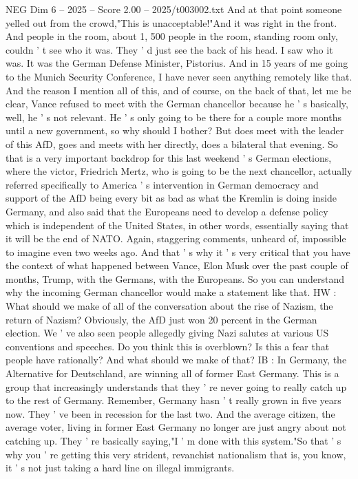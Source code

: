 \begin{textsample}{NEG Dim 6 – 2025 – Score 2.00 – 2025/t003002.txt}
And at that point someone yelled out from the crowd,"This is unacceptable!"And it was right in the front.
And people in the room, about 1, 500 people in the room, standing room only, couldn ' t see who it was.
They ' d just see the back of his head.
I saw who it was.
It was the German Defense Minister, Pistorius.
And in 15 years of me going to the Munich Security Conference, I have never seen anything remotely like that.
And the reason I mention all of this, and of course, on the back of that, let me be clear, Vance refused to meet with the German chancellor because he ' s basically, well, he ' s not relevant.
He ' s only going to be there for a couple more months until a new government, so why should I bother?
But does meet with the leader of this AfD, goes and meets with her directly, does a bilateral that evening.
So that is a very important backdrop for this last weekend ' s German elections, where the victor, Friedrich Mertz, who is going to be the next chancellor, actually referred specifically to America ' s intervention in German democracy and support of the AfD being every bit as bad as what the Kremlin is doing inside Germany, and also said that the Europeans need to develop a defense policy which is independent of the United States, in other words, essentially saying that it will be the end of NATO.
Again, staggering comments, unheard of, impossible to imagine even two weeks ago.
And that ' s why it ' s very critical that you have the context of what happened between Vance, Elon Musk over the past couple of months, Trump, with the Germans, with the Europeans.
So you can understand why the incoming German chancellor would make a statement like that.
HW : What should we make of all of the conversation about the rise of Nazism, the return of Nazism?
Obviously, the AfD just won 20 percent in the German election.
We ' ve also seen people allegedly giving Nazi salutes at various US conventions and speeches.
Do you think this is overblown?
Is this a fear that people have rationally?
And what should we make of that?
IB : In Germany, the Alternative for Deutschland, are winning all of former East Germany.
This is a group that increasingly understands that they ' re never going to really catch up to the rest of Germany.
Remember, Germany hasn ' t really grown in five years now.
They ' ve been in recession for the last two.
And the average citizen, the average voter, living in former East Germany no longer are just angry about not catching up.
They ' re basically saying,"I ' m done with this system."So that ' s why you ' re getting this very strident, revanchist nationalism that is, you know, it ' s not just taking a hard line on illegal immigrants.

\end{textsample}
